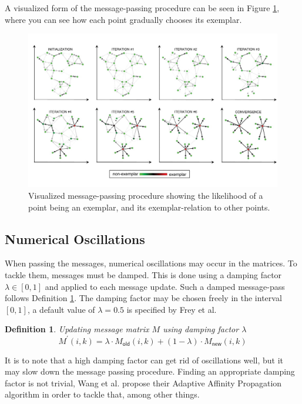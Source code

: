 \documentclass[11pt,a4paper]{article}
\newtheorem{definition}{Definition}
\begin{document}
A visualized form of the message-passing procedure can be seen in Figure \ref{fig:iterations}, where you can see how each point gradually chooses its exemplar.
\begin{figure}[h!]
	\centering
	\includegraphics[width=\textwidth]{../figures/frey-dueck-cluster.jpg}
	\caption{Visualized message-passing procedure \cite{frey2007clustering} showing the likelihood of a point being an exemplar, and its exemplar-relation to other points.}
	\label{fig:iterations}
\end{figure}
\pagebreak
\subsection{Numerical Oscillations}
When passing the messages, numerical oscillations may occur in the matrices. To tackle them, messages must be damped. This is done using a damping factor $\lambda \in \left[0,1\right]$ and applied to each message update. Such a damped message-pass follows Definition \ref{def:dampupdate}. The damping factor may be chosen freely in the interval $[0,1]$, a default value of $\lambda = 0.5$ is specified by Frey et al. \cite{frey2007clustering}
\begin{definition}\label{def:dampupdate}
	Updating message matrix $M$ using damping factor $\lambda$
	\[
		M^\prime (i,k) =\lambda \cdot M_{\mathsf{old}}(i,k) + (1-\lambda) \cdot M_{\mathsf{new}} (i,k)
	\]
\end{definition}
It is to note that a high damping factor can get rid of oscillations well, but it may slow down the message passing procedure. \cite{wang2008adaptive} Finding an appropriate damping factor is not trivial, Wang et al. propose their Adaptive Affinity Propagation algorithm in order to tackle that, among other things. \cite{wang2008adaptive}
\pagebreak
\end{document}
